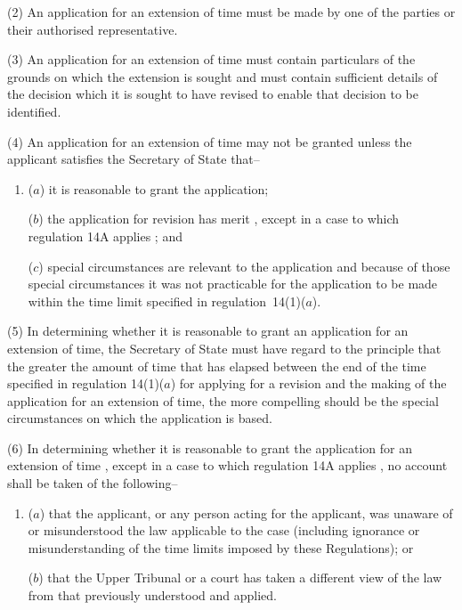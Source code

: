 \documentclass[12pt,a4paper]{article}
\begin{document}
(2) An application for an extension of time must be made by one of the parties or their authorised representative.

(3) An application for an extension of time must contain particulars of the grounds on which the extension is sought and must contain sufficient details of the decision which it is sought to have revised to enable that decision to be identified.

(4) An application for an extension of time may not be granted unless the applicant satisfies the Secretary of State that–
\begin{enumerate}\item[]
($a$) it is reasonable to grant the application;

($b$) the application for revision has merit%
, except in a case to which regulation 14A applies%
; and

($c$) special circumstances are relevant to the application and because of those special circumstances it was not practicable for the application to be made within the time limit specified in regulation~14(1)($a$).
\end{enumerate}

(5) In determining whether it is reasonable to grant an application for an extension of time, the Secretary of State must have regard to the principle that the greater the amount of time that has elapsed between the end of the time specified in regulation 14(1)($a$)  for applying for a revision and the making of the application for an extension of time, the more compelling should be the special circumstances on which the application is based.

(6) In determining whether it is reasonable to grant the application for an extension of time%
, except in a case to which regulation 14A applies%
, no account shall be taken of the following–
\begin{enumerate}\item[]
($a$) that the applicant, or any person acting for the applicant, was unaware of or misunderstood the law applicable to the case (including ignorance or misunderstanding of the time limits imposed by these Regulations); or

($b$) that the Upper Tribunal or a court has taken a different view of the law from that previously understood and applied.
\end{enumerate}
\end{document}

